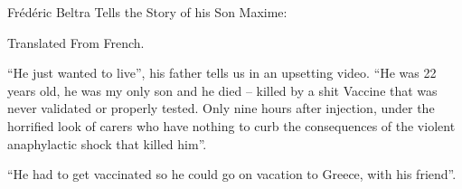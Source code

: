 Frédéric Beltra Tells the Story of his Son Maxime:

Translated From French.

“He just wanted to live”, his father tells us in an upsetting video. “He was 22
years old, he was my only son and he died – killed by a shit Vaccine that was
never validated or properly tested. Only nine hours after injection, under the
horrified look of carers who have nothing to curb the consequences of the
violent anaphylactic shock that killed him”.

“He had to get vaccinated so he could go on vacation to Greece, with his
friend”.


